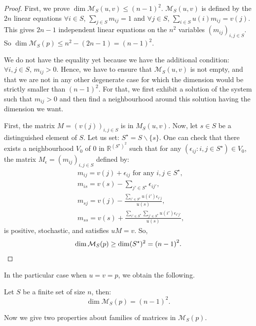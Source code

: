 \documentclass[10pt]{amsart}
\theoremstyle{definition}\newtheorem{defi}[theo]{Definition}\newtheorem{rema}[theo]{Remark}\newtheorem{exam}[theo]{Example}\newtheorem{exem}[theo]{Example}\newtheorem{nota}[theo]{Notation}
\newcounter{a}
\newcommand{\RR}{\mathbb{R}}
\let\oldforall\forall
\renewcommand*{\forall}{\mathrel{\oldforall}}
\begin{document}
\begin{proof}
First, we prove $\dim \mathcal{M}_S(u,v) \leq (n-1)^2$. $\mathcal{M}_S(u,v)$ is defined by the $2n$ linear equations $\forall i\in S$, $\sum_{j\in S} m_{ij} = 1$ and $\forall j\in S$, $\sum_{i\in S} u(i) m_{ij} = v(j)$. This gives $2n-1$ independent linear equations on the $n^2$ variables $(m_{ij})_{i,j \in S}$. So $\dim \mathcal{M}_S(p) \leq n^2 - (2n-1) = (n-1)^2$.

We do not have the equality yet because we have the additional condition: $\forall i,j\in S$, $m_{ij}>0$. Hence, we have to ensure that $\mathcal{M}_S(u,v)$ is not empty, and that we are not in any other degenerate case for which the dimension would be strictly smaller than $(n-1)^2$. For that, we first exhibit a solution of the system such that $m_{ij}>0$ and then find a neighbourhood around this solution having the dimension we want.

First, the matrix $M = (v(j))_{i,j \in S}$ is in $M_S(u,v)$. Now, let $s \in S$ be a distinguished element of $S$. Let us set: $S^\star = S \backslash \{s\}$. One can check that there exists a neighbourhood $V_0$ of $0$ in $\RR^{(S^\star)^2}$ such that for any $(\epsilon_{ij} : i,j \in S^\star) \in V_0$, the matrix $M_{\epsilon} = (m_{ij})_{i,j \in S}$ defined by:
\begin{align*}
& m_{ij} = v(j)+\epsilon_{ij} \text{ for any } i,j \in S^\star,\\
& m_{is} = v(s) - \sum_{j' \in S^\star} \epsilon_{ij'},\\
& m_{sj} = v(j) - \frac{\sum_{i' \in S^\star} u(i') \epsilon_{i'j}}{u(s)},\\
& m_{ss} = v(s) + \frac{\sum_{i' \in S^\star} \sum_{j' \in S^\star} u(i') \epsilon_{i'j'}}{u(s)},
\end{align*}
is positive, stochastic, and satisfies $uM=v$. So,
\[
\dim \mathcal{M}_S(p) \geq \dim (S^\star)^2={(n-1)}^2.
\qedhere
\]
\end{proof}

In the particular case when $u=v=p$, we obtain the following.

\begin{coro}\label{cor:dim-mp}
Let $S$ be a finite set of size $n$, then:
\begin{equation*}
\dim \mathcal{M}_S(p) = (n-1)^2.
\end{equation*}
\end{coro}

Now we give two properties about families of matrices in $\mathcal{M}_S(p)$.
\end{document}
